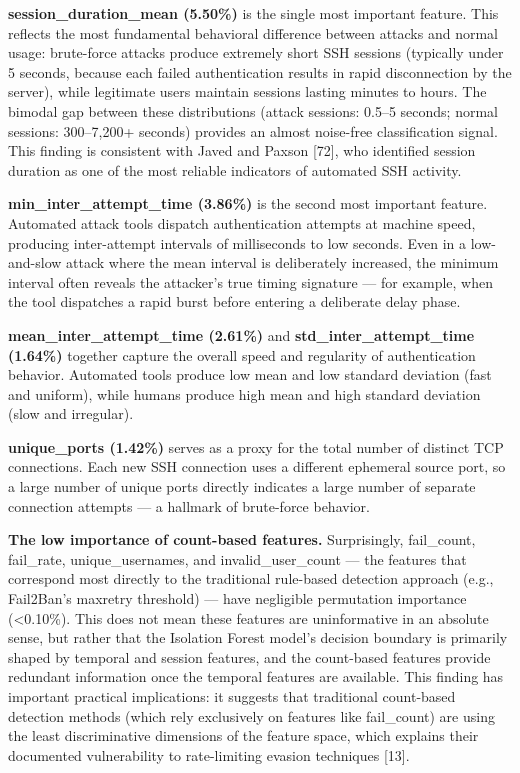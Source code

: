 \documentclass[
  a4paper]{report}
\begin{document}
\textbf{session\_duration\_mean (5.50\%)} is the single most important
feature. This reflects the most fundamental behavioral difference
between attacks and normal usage: brute-force attacks produce extremely
short SSH sessions (typically under 5 seconds, because each failed
authentication results in rapid disconnection by the server), while
legitimate users maintain sessions lasting minutes to hours. The bimodal
gap between these distributions (attack sessions: 0.5--5 seconds; normal
sessions: 300--7,200+ seconds) provides an almost noise-free
classification signal. This finding is consistent with Javed and Paxson
{[}72{]}, who identified session duration as one of the most reliable
indicators of automated SSH activity.

\textbf{min\_inter\_attempt\_time (3.86\%)} is the second most important
feature. Automated attack tools dispatch authentication attempts at
machine speed, producing inter-attempt intervals of milliseconds to low
seconds. Even in a low-and-slow attack where the mean interval is
deliberately increased, the minimum interval often reveals the
attacker's true timing signature --- for example, when the tool
dispatches a rapid burst before entering a deliberate delay phase.

\textbf{mean\_inter\_attempt\_time (2.61\%)} and
\textbf{std\_inter\_attempt\_time (1.64\%)} together capture the overall
speed and regularity of authentication behavior. Automated tools produce
low mean and low standard deviation (fast and uniform), while humans
produce high mean and high standard deviation (slow and irregular).

\textbf{unique\_ports (1.42\%)} serves as a proxy for the total number
of distinct TCP connections. Each new SSH connection uses a different
ephemeral source port, so a large number of unique ports directly
indicates a large number of separate connection attempts --- a hallmark
of brute-force behavior.

\textbf{The low importance of count-based features.} Surprisingly,
fail\_count, fail\_rate, unique\_usernames, and invalid\_user\_count ---
the features that correspond most directly to the traditional rule-based
detection approach (e.g., Fail2Ban's maxretry threshold) --- have
negligible permutation importance (\textless0.10\%). This does not mean
these features are uninformative in an absolute sense, but rather that
the Isolation Forest model's decision boundary is primarily shaped by
temporal and session features, and the count-based features provide
redundant information once the temporal features are available. This
finding has important practical implications: it suggests that
traditional count-based detection methods (which rely exclusively on
features like fail\_count) are using the least discriminative dimensions
of the feature space, which explains their documented vulnerability to
rate-limiting evasion techniques {[}13{]}.
\end{document}
